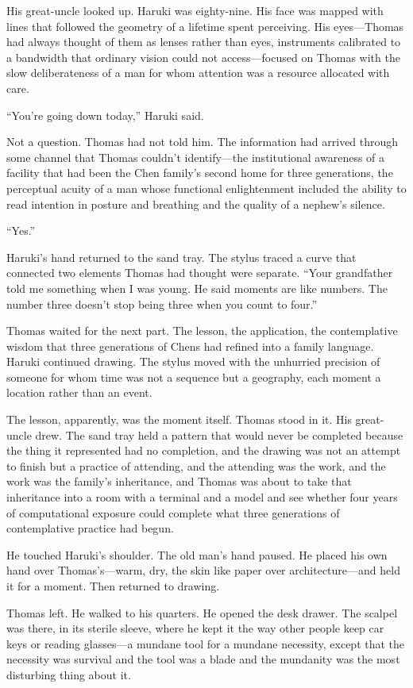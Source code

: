 His great-uncle looked up. Haruki was eighty-nine. His face was mapped with lines that followed the geometry of a lifetime spent perceiving. His eyes---Thomas had always thought of them as lenses rather than eyes, instruments calibrated to a bandwidth that ordinary vision could not access---focused on Thomas with the slow deliberateness of a man for whom attention was a resource allocated with care.

``You're going down today,'' Haruki said.

Not a question. Thomas had not told him. The information had arrived through some channel that Thomas couldn't identify---the institutional awareness of a facility that had been the Chen family's second home for three generations, the perceptual acuity of a man whose functional enlightenment included the ability to read intention in posture and breathing and the quality of a nephew's silence.

``Yes.''

Haruki's hand returned to the sand tray. The stylus traced a curve that connected two elements Thomas had thought were separate. ``Your grandfather told me something when I was young. He said moments are like numbers. The number three doesn't stop being three when you count to four.''

Thomas waited for the next part. The lesson, the application, the contemplative wisdom that three generations of Chens had refined into a family language. Haruki continued drawing. The stylus moved with the unhurried precision of someone for whom time was not a sequence but a geography, each moment a location rather than an event.

The lesson, apparently, was the moment itself. Thomas stood in it. His great-uncle drew. The sand tray held a pattern that would never be completed because the thing it represented had no completion, and the drawing was not an attempt to finish but a practice of attending, and the attending was the work, and the work was the family's inheritance, and Thomas was about to take that inheritance into a room with a terminal and a model and see whether four years of computational exposure could complete what three generations of contemplative practice had begun.

He touched Haruki's shoulder. The old man's hand paused. He placed his own hand over Thomas's---warm, dry, the skin like paper over architecture---and held it for a moment. Then returned to drawing.

Thomas left. He walked to his quarters. He opened the desk drawer. The scalpel was there, in its sterile sleeve, where he kept it the way other people keep car keys or reading glasses---a mundane tool for a mundane necessity, except that the necessity was survival and the tool was a blade and the mundanity was the most disturbing thing about it.

